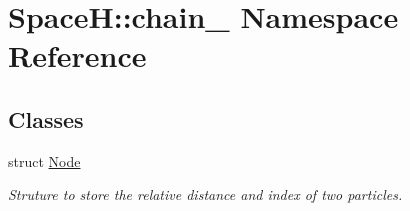 \hypertarget{namespace_space_h_1_1chain}{}\section{SpaceH\+:\+:chain_ Namespace Reference}
\label{namespace_space_h_1_1chain}
\subsection*{Classes}
\begin{DoxyCompactItemize}
\item 
struct \mbox{\hyperlink{struct_space_h_1_1chain_1_1_node}{Node}}
\begin{DoxyCompactList}\small\item\em Struture to store the relative distance and index of two particles. \end{DoxyCompactList}\end{DoxyCompactItemize}
